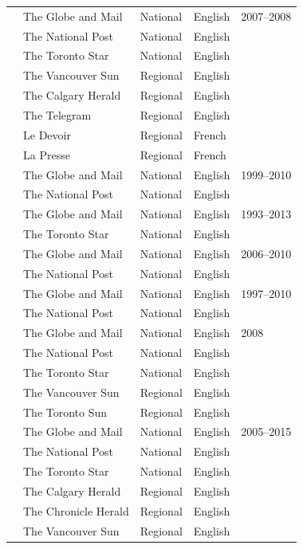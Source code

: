 \documentclass[12pt]{article}
\renewcommand\_{\texttt{\detokenize{_}\allowbreak}}
\begin{document}
{\begin{longtable}{p{5cm}p{6cm}p{4cm}p{3cm}p{3.5cm}}
\midrule
\textcite{young_comparing_2012} & The Globe and Mail & National & English & 2007--2008 \\
& The National Post & National & English & \\
& The Toronto Star & National & English & \\
& The Vancouver Sun & Regional & English & \\
& The Calgary Herald & Regional & English & \\
& The Telegram & Regional & English & \\
& Le Devoir & Regional & French & \\
& La Presse & Regional & French & \\
\midrule
\textcite{stoddart_canadian_2015} & The Globe and Mail & National & English & 1999--2010 \\
& The National Post & National & English & \\
\midrule
\textcite{ford_coverage_2015} & The Globe and Mail & National & English & 1993--2013 \\
& The Toronto Star & National & English & \\
\midrule
\textcite{stoddart_endangered_2016} & The Globe and Mail & National & English & 2006--2010 \\
& The National Post & National & English & \\
\midrule
\textcite{stoddart_media_2017} & The Globe and Mail & National & English & 1997--2010 \\
& The National Post & National & English & \\
\midrule
\textcite{barkemeyer_media_2017} & The Globe and Mail & National & English & 2008 \\
& The National Post & National & English & \\
& The Toronto Star & National & English & \\
& The Vancouver Sun & Regional & English & \\
& The Toronto Sun & Regional & English & \\
\midrule
\textcite{king_how_2019} & The Globe and Mail & National & English & 2005--2015 \\
& The National Post & National & English & \\
& The Toronto Star & National & English & \\
& The Calgary Herald & Regional & English & \\
& The Chronicle Herald & Regional & English & \\
& The Vancouver Sun & Regional & English & \\

\end{longtable}}
\end{document}
